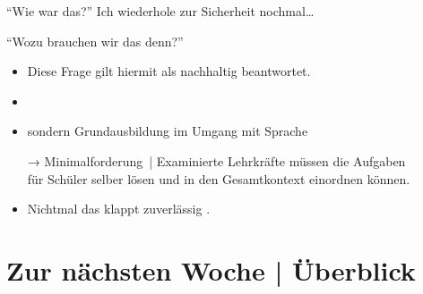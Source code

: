 \begin{frame}
  {"`Wie war das?"'}
  Ich wiederhole zur Sicherheit nochmal\ldots\\
  \Zeile
  \onslide<+->
  \begin{center}
    \Large{}
  \end{center}
\end{frame}

\begin{frame}
  {"`Wozu brauchen wir das denn?"'}
  \onslide<+->
  \begin{itemize}[<+->]
    \item Diese Frage gilt hiermit als nachhaltig beantwortet.
      \Zeile
    \item {}
    \item sondern Grundausbildung im \alert{Umgang mit Sprache} 
      \Zeile
    \item[→] Minimalforderung | \alert{Examinierte Lehrkräfte müssen die Aufgaben\\
         für Schüler selber lösen und in den Gesamtkontext einordnen können.}
    \item Nichtmal das klappt zuverlässig \citep{SchaeferSayatz2017a}.
  \end{itemize}
\end{frame}

\section{Zur nächsten Woche | Überblick}

